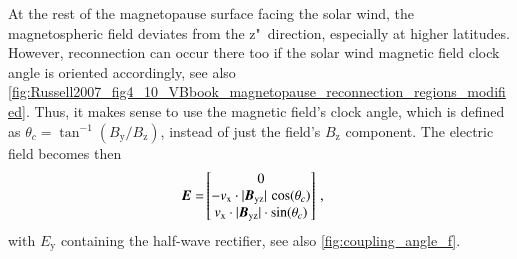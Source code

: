 At the rest of the magnetopause surface facing the solar wind, the magnetospheric field deviates from the z"~direction, especially at higher latitudes. However, reconnection can occur there too if the solar wind magnetic field clock angle is oriented accordingly, see also \autoref{fig:Russell2007_fig4_10_VBbook_magnetopause_reconnection_regions_modified}. Thus, it makes sense to use the magnetic field's clock angle, which is defined as $\theta_c = \tan^{-1}\left(B_\text{y} / B_\text{z}\right)$, instead of just the field's $B_\text{z}$ component. The electric field becomes then
\begin{align}
	\boldsymbol{E} =& \begin{bmatrix}
		0\\
		- v_\text{x} \cdot |\boldsymbol{B_\text{yz}}| \, \cos(\theta_c)\\
		v_\text{x} \cdot |\boldsymbol{B_\text{yz}}| \cdot \sin(\theta_c)\\
	\end{bmatrix}	\,,
\end{align}
with $E_\text{y}$ containing the half-wave rectifier, see also \autoref{fig:coupling_angle_f}.




